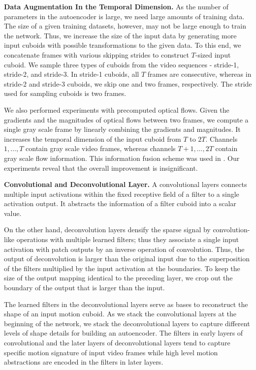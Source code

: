 \documentclass[10pt,twocolumn,letterpaper]{article}
\begin{document}
\vspace{.5em}
\noindent \textbf{Data Augmentation In the Temporal Dimension.}
As the number of parameters in the autoencoder is large, we need large amounts of training data.
The size of a given training datasets, however, may not be large enough to train the network.
Thus, we increase the size of the input data by generating more input cuboids with possible transformations to the given data.
To this end, we concatenate frames with various skipping strides to construct $T$-sized input cuboid.
We sample three types of cuboids from the video sequences - stride-1, stride-2, and stride-3. 
In stride-1 cuboids, all $T$ frames are consecutive, whereas in stride-2 and stride-3 cuboids, we skip one and two frames, respectively.
The stride used for sampling cuboids is two frames.


We also performed experiments with precomputed optical flows. 
Given the gradients and the magnitudes of optical flows between two frames, we compute a single gray scale frame by linearly combining the gradients and magnitudes.
It increases the temporal dimension of the input cuboid from $T$ to $2T$. 
Channels $1, \ldots, T$ contain gray scale video frames, whereas channels $T+1, \ldots, 2T$ contain gray scale flow information. 
This information fusion scheme was used in \cite{ngHVVMT15}.
Our experiments reveal that the overall improvement is insignificant.


\vspace{.5em}
\noindent \textbf{Convolutional and Deconvolutional Layer.}
A convolutional layers connects multiple input activations within the fixed receptive field of a filter to a single activation output.
It abstracts the information of a filter cuboid into a scalar value.


On the other hand, deconvolution layers densify the sparse signal by convolution-like operations with multiple learned filters; thus they associate a single input activation with patch outputs by an inverse operation of convolution.
Thus, the output of deconvolution is larger than the original input due to the superposition of the filters multiplied by the input activation at the boundaries. 
To keep the size of the output mapping identical to the preceding layer, we crop out the boundary of the output that is larger than the input.

The learned filters in the deconvolutional layers serve as bases to reconstruct the shape of an input motion cuboid.
As we stack the convolutional layers at the beginning of the network, we stack the deconvolutional layers to capture different levels of shape details for building an autoencoder.
The filters in early layers of convolutional and the later layers of deconvolutional layers tend to capture specific motion signature of input video frames while high level motion abstractions are encoded in the filters in later layers.
\end{document}
